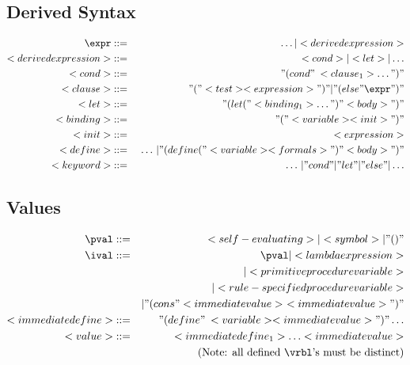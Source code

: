 \documentclass[11pt]{article}
\begin{document}
\subsection{Derived Syntax}

\begin{bnf}
\begin{eqnarray*}
\expr &::=& \ldots | <derived expression>\\
<derived expression> &::=& <cond> | <let> | \ldots\\
<cond> &::=& "(cond"\: <clause_{1}> \ldots ")"\\
<clause> &::=& "(" <test> <expression>")" | "(else " \expr ")"\\
<let> &::=& "(let ("<binding_{1}> \ldots") " <body> ")" \\
<binding> &::=& "(" <variable> <init> ")"\\
<init> &::=& <expression>\\
<define> &::=& \ \ldots\, | "(define ("<variable> <formals>")" <body>")"\\
<keyword>  &::=&  \ \ldots\, | "cond" | "let" | "else" | \ldots\\
\end{eqnarray*}
\end{bnf}


\subsection{Values}

\begin{bnf}
\begin{eqnarray*}
\pval &::=&  <self-evaluating> | <symbol> | "()"\\
\ival &::=& \pval | <lambda expression>\\
        && {} | <primitive procedure variable>\\
        && {} | <rule-specified procedure variable>\\
        && {} | "(cons "<immediate value>\ <immediate value>")"\\
<immediate define> &::=& "(define"\: <variable> <immediate value>")" \ldots\\
<value> &::=& <immediate define_{1}> \ldots <immediate value>\\
        && {} \qquad \hbox{(Note: all defined \vrbl's must be distinct)}\\
\end{eqnarray*}
\end{bnf}
\end{document}
